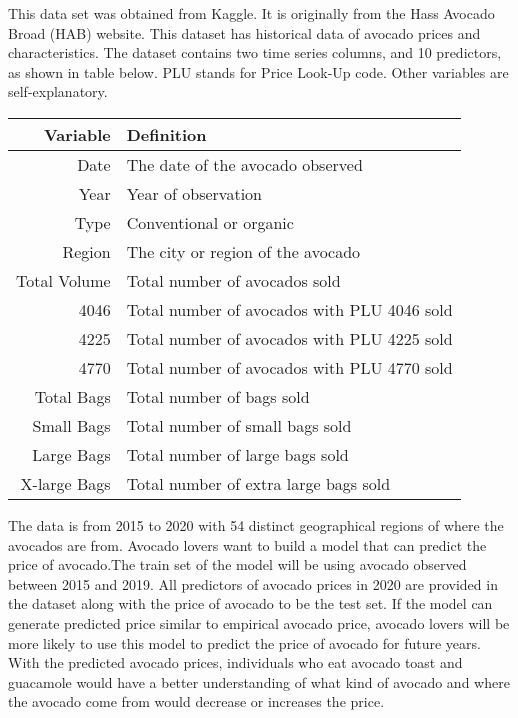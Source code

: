 \documentclass[11pt]{article}
\begin{document}
This data set was obtained from Kaggle. It is originally from the Hass Avocado Broad (HAB) website. This dataset has historical data of avocado prices and characteristics. The dataset contains two time series columns, and 10 predictors, as shown in table below. PLU stands for Price Look-Up code. Other variables are self-explanatory. 
\begin{center}
\begin{tabular}{|r|l|}
\hline
Variable & Definition \\ \hline
Date & The date of the avocado observed \\
Year & Year of observation\\ \hline
Type & Conventional or organic \\ 
Region & The city or region of the avocado \\
Total Volume & Total number of avocados sold \\
4046 & Total number of avocados with PLU 4046 sold\\
4225 & Total number of avocados with PLU 4225 sold \\
4770 & Total number of avocados with PLU 4770 sold \\
Total Bags & Total number of bags sold\\
Small Bags & Total number of small bags sold\\
Large Bags & Total number of large bags sold\\
X-large Bags & Total number of  extra large bags sold\\ \hline
\end{tabular}
\end{center}

The data is from 2015 to 2020 with 54 distinct geographical regions of where the avocados are from. Avocado lovers want to build a model that can predict the price of avocado.The train set of the model will be using avocado observed between 2015 and 2019. All predictors of avocado prices in 2020 are provided in the dataset along with the price of avocado to be the test set. If the model can generate predicted price similar to empirical avocado price, avocado lovers will be more likely to use this model to predict the price of avocado for future years. With the predicted avocado prices, individuals who eat avocado toast and guacamole would have a better understanding of what kind of avocado and where the avocado come from would decrease or increases the price. 


\vspace{0.5cm}
\end{document}
